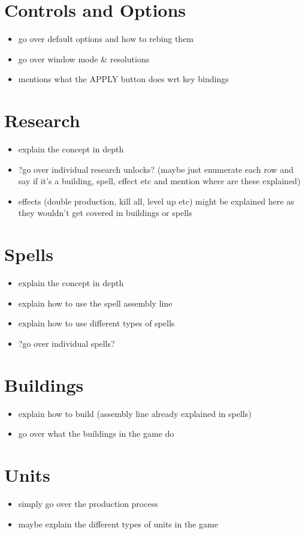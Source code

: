 \section{Controls and Options}

\begin{itemize}
    \item go over default options and how to rebing them
    \item go over window mode \& resolutions
    \item mentions what the APPLY button does wrt key bindings
\end{itemize}

\section{Research}

\begin{itemize}
    \item explain the concept in depth
    \item ?go over individual research unlocks?
	    (maybe just enumerate each row and say if it's a building, spell, effect etc
	    and mention where are these explained)
    \item effects (double production, kill all, level up etc) might be explained here as they
	    wouldn't get covered in buildings or spells
\end{itemize}

\section{Spells}

\begin{itemize}
    \item explain the concept in depth
    \item explain how to use the spell assembly line
    \item explain how to use different types of spells
    \item ?go over individual spells?
\end{itemize}

\section{Buildings}

\begin{itemize}
    \item explain how to build (assembly line already explained in spells)
    \item go over what the buildings in the game do
\end{itemize}

\section{Units}

\begin{itemize}
    \item simply go over the production process
    \item maybe explain the different types of units in the game
\end{itemize}

